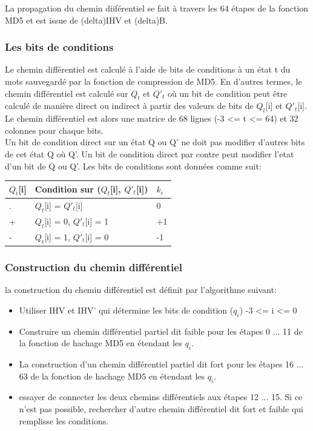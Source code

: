 \documentclass[a4paper,11pt,french]{article}
\begin{document}
La propagation du chemin diiférentiel se fait à travers les 64 étapes de la fonction MD5 et est issue de (delta)IHV et (delta)B.

\subsubsection{Les bits de conditions}
Le chemin différentiel est calculé à l'aide de bits de conditions à un état t du mots sauvegardé par la fonction de compression de MD5. En d'autres termes, le chemin différentiel est calculé sur $Q_t$ et $Q'_t$ où un bit de condition peut être calculé de manière direct ou indirect à partir des valeurs de bits de $Q_t$[i] et $Q'_t$[i]. Le chemin différentiel est alors une matrice de 68 lignes (-3 <= t <= 64) et 32 colonnes pour chaque bits.\\

Un bit de condition direct sur un état Q ou Q' ne doit pas modifier d'autres bits de cet état Q où Q'. Un bit de condition direct par contre peut modifier l'etat d'un bit de Q ou Q'. Les bits de conditions sont données comme suit:\\


\begin{tabular}{lll}
\hline
	$Q_t$[i] &\vline \hspace{.1cm} Condition sur ($Q_t$[i], $Q'_t$[i]) &\vline \hspace{.1cm} $k_i$ \\ \hline
	. &\vline \hspace{.1cm} $Q_t$[i] = $Q'_t$[i] &\vline \hspace{.1cm} 0 \\ \hline
	+ &\vline \hspace{.1cm} $Q_t$[i] = 0, $Q'_t$[i] = 1 &\vline \hspace{.1cm} +1 \\ \hline
	- &\vline \hspace{.1cm} $Q_t$[i] = 1, $Q'_t$[i] = 0 &\vline \hspace{.1cm} -1 \\ \hline
\end{tabular}

\subsubsection{Construction du chemin différentiel}
la construction du chemin différentiel est définit par l'algorithme suivant: 
\begin{itemize}
  \item Utiliser IHV et IHV' qui détermine les bits de condition ($q_i$) -3 <= i <= 0
  \item Construire un chemin différentiel partiel dit faible pour les étapes 0 ... 11 de la fonction de hachage MD5 en étendant les $q_i$.
  \item La construction d'un chemin différentiel partiel dit fort pour les étapes 16 ... 63 de la fonction de hachage MD5 en étendant les $q_i$.
    \item essayer de connecter les deux chemins différentiels aux étapes 12 ... 15. Si ce n'est pas possible, rechercher d'autre chemin différentiel dit fort et faible qui remplisse les conditions.
\end{itemize}
\end{document}
